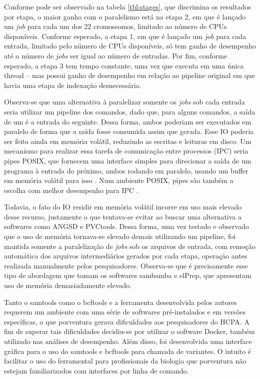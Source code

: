 \documentclass[cic,tc]{iiufrgs}
\begin{document}
Conforme pode ser observado na tabela \ref{tbl:stages}, que discrimina os
resultados por etapa, o maior ganho com o paralelismo está na etapa 2, em que é
lançado um \textit{job} para cada um dos 22 cromossomos, limitado ao número de
CPUs disponíveis. Conforme esperado, a etapa 1, em que é lançado um
\textit{job} para cada entrada, limitado pelo número de CPUs disponíveis, só
tem ganho de desempenho até o número de \textit{jobs} ser igual ao número de
entradas. Por fim, conforme esperado, a etapa 3 tem tempo constante, uma vez
que executa em uma única thread -- mas possui ganho de desempenho em relação ao
pipeline original em que havia uma etapa de indexação desnecessária.

Observa-se que uma alternativa à paralelizar somente os \textit{jobs} sob cada
entrada seria utilizar um pipeline dos comandos, dado que, para alguns
comandos, a saída de um é a entrada do seguinte. Dessa forma, ambos poderiam
ser executados em paralelo de forma que a saída fosse consumida assim que
gerada. Esse IO poderia ser feito ainda em memória volátil, reduzindo as
escritas e leituras em disco. Um mecanismo para realizar essa tarefa de
comunicação entre processos (IPC) seria pipes POSIX, que fornecem uma interface
simples para direcionar a saída de um programa à entrada do próximo, ambos
rodando em paralelo, usando um buffer em memória volátil para
isso \cite{immich2003performance}. Num ambiente POSIX, pipes são também a
escolha com melhor desempenho para IPC \cite{immich2003performance}.

Todavia, o fato do IO residir em memória volátil incorre em uso mais elevado
desse recurso, justamente o que tentava-se evitar ao buscar uma alternativa a
softwares como ANGSD e PVCtools. Dessa forma, uma vez testado e observado que o
uso de memória tornava-se elevado demais utilizando um pipeline, foi mantida
somente a paralelização de \textit{jobs} sob os arquivos de entrada, com
remoção automática dos arquivos intermediários gerados por cada etapa, operação
antes realizada manualmente pelos pesquisadores. Observa-se que é precisamente
esse tipo de abordagem que tomam os softwares sambamba e elPrep, que apresentam
uso de memória demasiadamente elevado.

Tanto o samtools como o bcftools e a ferramenta desenvolvida pelos autores
requerem um ambiente com uma série de softwares pré-instalados e em versões
específicas, o que porventura gerava dificuldades aos pesquisadores do HCPA. A
fim de superar tais dificuldades decidiu-se por utilizar o software Docker,
também utilizado nas análises de desempenho. Além disso, foi desenvolvida uma
interface gráfica para o uso do samtools e bcftools para chamada de variantes.
O intuito é facilitar o uso do ferramental para profissionais da biologia que
porventura não estejam familiarizados com interfaces por linha de comando.
\end{document}
